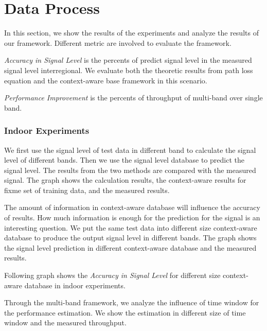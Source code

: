 \section{Data Process}
\label{sec:experiment}
In this section, we show the results of the experiments and analyze the results of our framework. Different metric are involved to evaluate the framework.

\emph{Accuracy in Signal Level} is the percents of predict signal level in the measured signal level interregional. We evaluate both the theoretic results from path loss equation and the context-aware base framework in this scenario.

\emph{Performance Improvement} is the percents of throughput of multi-band over single band.


\subsubsection{Indoor Experiments} 
We first use the signal level of test data in different band to calculate the signal level of different bands. Then we use the signal level database to predict the signal level. The results from the two methods are compared with the measured signal. The graph shows the calculation results, the context-aware results for fixme set of training data, and the measured results.


The amount of information in context-aware database will influence the accuracy of results. How much information is enough for the prediction for the signal is an interesting question. We put the same test data into different size context-aware database to produce the output signal level in different bands. The graph shows the signal level prediction in different context-aware database and the measured results.


Following graph shows the \emph{Accuracy in Signal Level} for different size context-aware database in indoor experiments.



Through the multi-band framework, we analyze the influence of time window for the performance estimation. We show the estimation in different size of time window and the measured throughput.



